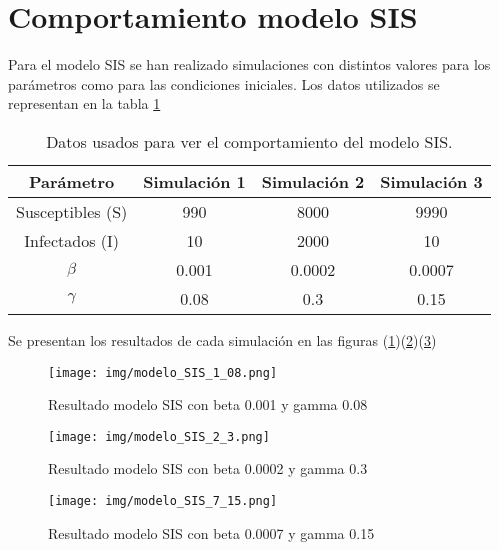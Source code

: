 \section{Comportamiento modelo SIS}
Para el modelo SIS se han realizado simulaciones con distintos
valores para los parámetros como para las condiciones iniciales. Los datos utilizados se representan en la tabla \ref{tab:datos para modelo SIS}
\begin{table}[H]
\centering
\begin{tabular}{|c|c|c|c|}
\hline
\textbf{Parámetro} & \textbf{Simulación 1} & \textbf{Simulación 2}  & \textbf{Simulación 3}\\
\hline
Susceptibles (S) & 990 & 8000 & 9990\\
\hline
Infectados (I)   & 10   & 2000 & 10  \\
\hline
\(\beta\)        & 0.001 & 0.0002  & 0.0007\\
\hline
\(\gamma\)        & 0.08 & 0.3 & 0.15\\
\hline
\end{tabular}
\caption{Datos usados para ver el comportamiento del modelo SIS.}
\label{tab:datos para modelo SIS}
\end{table}

Se presentan los resultados de cada simulación en las figuras (\ref{fig:simulacion 1 SIS})(\ref{fig:simulación 2 SIS})(\ref{fig:Simulación 3 SIS})

\begin{figure}[H]
    \centering
    \texttt{[image: img/modelo\_SIS\_1\_08.png]}
    \caption{Resultado modelo SIS con beta 0.001 y gamma 0.08}
    \label{fig:simulacion 1 SIS}
    \vspace{0.5cm} %
\end{figure}

\begin{figure}[H]
    \centering
    \texttt{[image: img/modelo\_SIS\_2\_3.png]}
    \caption{Resultado modelo SIS con beta 0.0002 y gamma 0.3}
    \label{fig:simulación 2 SIS}
    \vspace{0.5cm} %
\end{figure}

\begin{figure}[H]
    \centering
    \texttt{[image: img/modelo\_SIS\_7\_15.png]}
    \caption{Resultado modelo SIS con beta 0.0007 y gamma 0.15}
    \label{fig:Simulación 3 SIS}
    \vspace{0.5cm} %
\end{figure}

